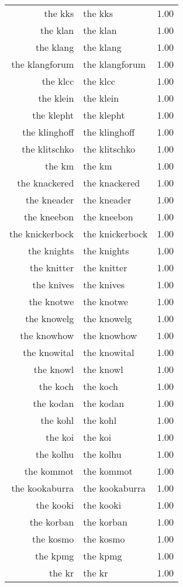 \begin{table}[ht]
\begin{tabular}{rlr}
  the kks & the kks & 1.00 \\ 
  the klan & the klan & 1.00 \\ 
  the klang & the klang & 1.00 \\ 
  the klangforum & the klangforum & 1.00 \\ 
  the klcc & the klcc & 1.00 \\ 
  the klein & the klein & 1.00 \\ 
  the klepht & the klepht & 1.00 \\ 
  the klinghoff & the klinghoff & 1.00 \\ 
  the klitschko & the klitschko & 1.00 \\ 
  the km & the km & 1.00 \\ 
  the knackered & the knackered & 1.00 \\ 
  the kneader & the kneader & 1.00 \\ 
  the kneebon & the kneebon & 1.00 \\ 
  the knickerbock & the knickerbock & 1.00 \\ 
  the knights & the knights & 1.00 \\ 
  the knitter & the knitter & 1.00 \\ 
  the knives & the knives & 1.00 \\ 
  the knotwe & the knotwe & 1.00 \\ 
  the knowelg & the knowelg & 1.00 \\ 
  the knowhow & the knowhow & 1.00 \\ 
  the knowital & the knowital & 1.00 \\ 
  the knowl & the knowl & 1.00 \\ 
  the koch & the koch & 1.00 \\ 
  the kodan & the kodan & 1.00 \\ 
  the kohl & the kohl & 1.00 \\ 
  the koi & the koi & 1.00 \\ 
  the kolhu & the kolhu & 1.00 \\ 
  the kommot & the kommot & 1.00 \\ 
  the kookaburra & the kookaburra & 1.00 \\ 
  the kooki & the kooki & 1.00 \\ 
  the korban & the korban & 1.00 \\ 
  the kosmo & the kosmo & 1.00 \\ 
  the kpmg & the kpmg & 1.00 \\ 
  the kr & the kr & 1.00 \\ 

\end{tabular}
\end{table}
